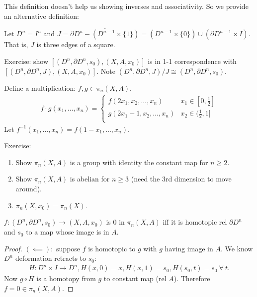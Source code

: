 \documentclass[12pt,class=article,crop=false]{standalone}
\begin{document}
This definition doesn't help us showing inverses and associativity. So we provide an alternative definition:
\begin{defn}
	Let $ D^{n} = I^{n}$ and $ J = \overline{\partial D^{n}-(D^{n-1} \times \{1\} )} = (D^{n-1} \times \{0\} ) \cup (\partial D^{n-1} \times I)$. That is, $ J$ is three edges of a square.
\end{defn}
	Exercise: show $ [(D^{n}, \partial D^{n}, s_0),(X,A,x_0)]$ is in 1-1 correspondence with $ [(D^{n}, \partial D^{n},J),(X,A,x_0)]$. Note $ (D^{n}, \partial D^{n}, J) / J \cong(D^{n}, \partial D^{n}, s_0)$.

Define a multiplication: $ f,g \in \pi_n(X,A)$.
\begin{align*}
	f \cdot g (x_1,\ldots,x_n) = \begin{cases}
		f(2x_1,x_2,\ldots,x_n) & x_1 \in [0, \frac{1}{2}]\\
		g(2x_1-1,x_2,\ldots,x_n) & x_2 \in (\frac{1}{2},1]\\
	\end{cases}
\end{align*}
	Let $ f ^{-1} (x_1,\ldots,x_n) = f(1-x_1,\ldots,x_n)$.

	Exercise:
	\begin{enumerate}[label=(\arabic*)]
		\item Show $ \pi_n(X,A)$ is a group with identity the constant map for $ n \geq 2$.
		\item Show  $ \pi_n(X,A)$ is abelian for $ n \geq 3$ (need the 3rd dimension to move around).
		\item  $ \pi_n(X,x_0) = \pi_n(X)$.
	\end{enumerate}

	\begin{lem}
	$ f: (D^{n}, \partial D^{n},s_0) \to (X,A,x_0)$ is $ 0$ in  $ \pi_n(X,A)$ iff it is homotopic rel $ \partial D^{n}$ and $ s_0$ to a map whose image is in $ A$.
	\end{lem}
	\begin{proof}
	$ (\impliedby):$ suppose $ f$ is homotopic to  $ g$ with  $ g$ having image in  $ A$. We know  $ D^{n}$ deformation retracts to $ s_0$:
	\begin{align*}
		H: D^{n} \times I \to D^{n}, H(x,0) = x, H(x,1) = s_0, H(s_0,t) = s_0 \ \forall \ t.
	\end{align*}
	Now $ g \circ H$ is a homotopy from $ g$ to constant map (rel  $ A$). Therefore  $ f = 0 \in \pi_n(X,A)$.
	\end{proof}
\end{document}

